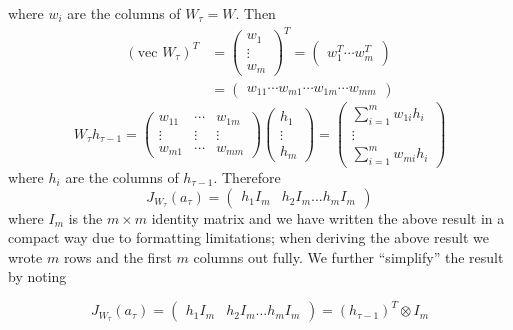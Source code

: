 where $w_i$ are the columns of $W_\tau = W$. Then
%
\begin{align*}
  (\mbox{vec } W_\tau)^T & = \begin{pmatrix}w_1 \\ \vdots \\ w_m \end{pmatrix}^T = \begin{pmatrix}w_1^T \cdots w_m^T \end{pmatrix} \\
  & = \begin{pmatrix} w_{11} \cdots w_{m1} \cdots w_{1m} \cdots w_{mm} \end{pmatrix}
\end{align*}
%
\begin{equation*}
  W_\tau h_{\tau - 1} = \begin{pmatrix}
    w_{11} & \cdots & w_{1m} \\
    \vdots & \vdots & \vdots \\
    w_{m1} & \cdots & w_{mm}
  \end{pmatrix} \begin{pmatrix}
    h_1 \\ \vdots \\ h_m
  \end{pmatrix} = \begin{pmatrix}
    \sum_{i=1}^m w_{1i} h_i \\
    \vdots \\
    \sum_{i=1}^m w_{mi} h_i
  \end{pmatrix}
\end{equation*}
%
where $h_i$ are the columns of $h_{\tau - 1}$. Therefore
%
\begin{equation*}
  J_{W_\tau}(a_{\tau}) = \begin{pmatrix}
    h_1 I_m & h_2 I_m \ldots h_m I_m
  \end{pmatrix}
\end{equation*}
%
where $I_m$ is the $m \times m$ identity matrix and we have written the above result in a compact way due to formatting limitations; when deriving the above result we wrote $m$ rows and the first $m$ columns out fully. We further ``simplify'' the result by noting

\begin{equation*}
J_{W_\tau}(a_\tau) = \begin{pmatrix}h_1 I_m & h_2 I_m \ldots h_m I_m \end{pmatrix} = (h_{\tau - 1})^T \otimes I_m
\end{equation*}


